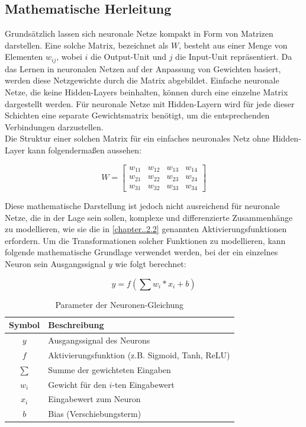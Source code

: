\documentclass[a4paper, 12pt]{article}
\begin{document}
\newpage %

\subsection{Mathematische Herleitung}\label{chapter..2.3}

Grundsätzlich lassen sich neuronale Netze kompakt in Form von Matrizen darstellen. Eine solche Matrix, 
bezeichnet als \( W \), besteht aus einer Menge von Elementen \( w_{ij} \), wobei \( i \) die 
Output-Unit und \( j \) die Input-Unit repräsentiert. Da das Lernen in neuronalen Netzen auf der 
Anpassung von Gewichten basiert, werden diese Netzgewichte durch die Matrix abgebildet. Einfache 
neuronale Netze, die keine Hidden-Layers beinhalten, können durch eine einzelne 
Matrix dargestellt werden. Für neuronale Netze mit Hidden-Layern wird für jede dieser Schichten 
eine separate Gewichtsmatrix benötigt, um die entsprechenden Verbindungen darzustellen.\\
Die Struktur einer solchen Matrix für ein einfaches neuronales Netz ohne Hidden-Layer kann 
folgendermaßen aussehen:

\[
W = 
\begin{bmatrix}
w_{11} & w_{12} & w_{13} & w_{14} \\
w_{21} & w_{22} & w_{23} & w_{24} \\
w_{31} & w_{32} & w_{33} & w_{34}
\end{bmatrix}
\]

Diese mathematische Darstellung ist jedoch nicht ausreichend für neuronale Netze, die in der Lage sein 
sollen, komplexe und differenzierte Zusammenhänge zu modellieren, wie sie die in \autoref{chapter..2.2} 
genannten Aktivierungsfunktionen erfordern. Um die Transformationen solcher Funktionen zu modellieren, 
kann folgende mathematische Grundlage verwendet werden, bei der ein einzelnes Neuron sein 
Ausgangssignal \( y \) wie folgt berechnet:

\[
y = f\left( \sum w_i * x_i + b \right)
\]

\begin{table}[ht]
    \centering
    \begin{tabular}{|c|l|}
        \hline
        \textbf{Symbol} & \textbf{Beschreibung} \\
        \hline
        \(y\) & Ausgangssignal des Neurons \\
        \(f\) & Aktivierungsfunktion (z.B. Sigmoid, Tanh, ReLU) \\
        \(\sum\) & Summe der gewichteten Eingaben \\
        \(w_i\) & Gewicht für den \(i\)-ten Eingabewert \\
        \(x_i\) & Eingabewert zum Neuron \\
        \(b\) & Bias (Verschiebungsterm) \\
        \hline
    \end{tabular}
	\caption{Parameter der Neuronen-Gleichung}
    \label{tab:neuron_para}
\end{table}
\end{document}
